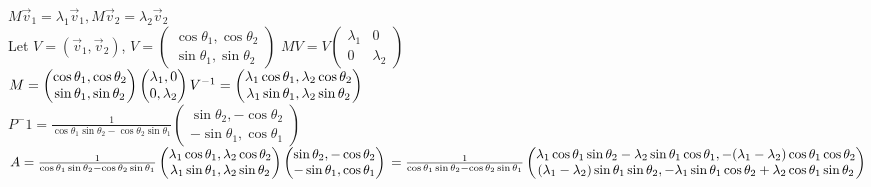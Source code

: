\documentclass[11pt, oneside]{article}   	%
\begin{document}
$M \vec v_1 = \lambda_1 \vec v_1,M \vec v_2 =\lambda_2 \vec v_2$ \\
Let $V=(\vec v_1, \vec v_2)$, $V =\begin{pmatrix}\cos{\theta_1},\cos{\theta_2}\\ \sin{\theta_1},\sin{\theta_2} \end{pmatrix}$ 
$MV= V\begin{pmatrix}
  \lambda_1 & 0\\
 0 & \lambda_2
\end{pmatrix}$\\
$M = 
\begin{pmatrix}
 \cos{\theta_1},\cos{\theta_2}\\ 
 \sin{\theta_1},\sin{\theta_2} 
\end{pmatrix}
\begin{pmatrix}
 \lambda_1,0\\
  0,\lambda_2
  \end{pmatrix}V^{-1}\\
= \begin{pmatrix}\lambda_1\cos{\theta_1},\lambda_2\cos{\theta_2}\\ \lambda_1\sin{\theta_1},\lambda_2\sin{\theta_2} \end{pmatrix}$\\
$P^-1= \frac{1}{\cos{\theta_1}\sin{\theta_2}-\cos{\theta_2}\sin{\theta_1}}\begin{pmatrix}\sin{\theta_2}, -\cos{\theta_2}\\  -\sin{\theta_1},\cos{\theta_1} \end{pmatrix}$\\
$A = \frac{1}{\cos{\theta_1}\sin{\theta_2}-\cos{\theta_2}\sin{\theta_1}} \begin{pmatrix}\lambda_1\cos{\theta_1},\lambda_2\cos{\theta_2}\\ \lambda_1\sin{\theta_1},\lambda_2\sin{\theta_2} \end{pmatrix}\begin{pmatrix}\sin{\theta_2}, -\cos{\theta_2}\\  -\sin{\theta_1},\cos{\theta_1} \end{pmatrix}\\
= \frac{1}{\cos{\theta_1}\sin{\theta_2}-\cos{\theta_2}\sin{\theta_1}}  \begin{pmatrix}\lambda_1\cos{\theta_1}\sin{\theta_2} - \lambda_2\sin{\theta_1}\cos{\theta_1},-(\lambda_1-\lambda_2)\cos{\theta_1}\cos{\theta_2}\\ 
(\lambda_1-\lambda_2)\sin{\theta_1}\sin{\theta_2},-\lambda_1\sin{\theta_1}\cos{\theta_2}+\lambda_2 \cos{\theta_1}\sin{\theta_2}\end{pmatrix}$
\end{document}
